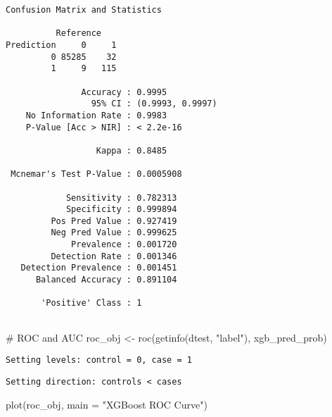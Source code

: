 \documentclass[
  11pt,
  letterpaper,
  DIV=11,
  numbers=noendperiod]{scrartcl}
\newenvironment{Shaded}{}{}
\newcommand{\AttributeTok}[1]{\textcolor[rgb]{0.84,0.23,0.29}{#1}}
\newcommand{\CommentTok}[1]{\textcolor[rgb]{0.42,0.45,0.49}{#1}}
\newcommand{\FunctionTok}[1]{\textcolor[rgb]{0.44,0.26,0.76}{#1}}
\newcommand{\NormalTok}[1]{\textcolor[rgb]{0.14,0.16,0.18}{#1}}
\newcommand{\OtherTok}[1]{\textcolor[rgb]{0.44,0.26,0.76}{#1}}
\newcommand{\StringTok}[1]{\textcolor[rgb]{0.01,0.18,0.38}{#1}}
\begin{document}
\begin{verbatim}
Confusion Matrix and Statistics

          Reference
Prediction     0     1
         0 85285    32
         1     9   115
                                          
               Accuracy : 0.9995          
                 95% CI : (0.9993, 0.9997)
    No Information Rate : 0.9983          
    P-Value [Acc > NIR] : < 2.2e-16       
                                          
                  Kappa : 0.8485          
                                          
 Mcnemar's Test P-Value : 0.0005908       
                                          
            Sensitivity : 0.782313        
            Specificity : 0.999894        
         Pos Pred Value : 0.927419        
         Neg Pred Value : 0.999625        
             Prevalence : 0.001720        
         Detection Rate : 0.001346        
   Detection Prevalence : 0.001451        
      Balanced Accuracy : 0.891104        
                                          
       'Positive' Class : 1               
                                          
\end{verbatim}

\begin{Shaded}
\begin{Highlighting}[]
\CommentTok{\# ROC and AUC}
\NormalTok{roc\_obj }\OtherTok{\textless{}{-}} \FunctionTok{roc}\NormalTok{(}\FunctionTok{getinfo}\NormalTok{(dtest, }\StringTok{"label"}\NormalTok{), xgb\_pred\_prob)}
\end{Highlighting}
\end{Shaded}

\begin{verbatim}
Setting levels: control = 0, case = 1
\end{verbatim}

\begin{verbatim}
Setting direction: controls < cases
\end{verbatim}

\begin{Shaded}
\begin{Highlighting}[]
\FunctionTok{plot}\NormalTok{(roc\_obj, }\AttributeTok{main =} \StringTok{"XGBoost ROC Curve"}\NormalTok{)}
\end{Highlighting}
\end{Shaded}
\end{document}
